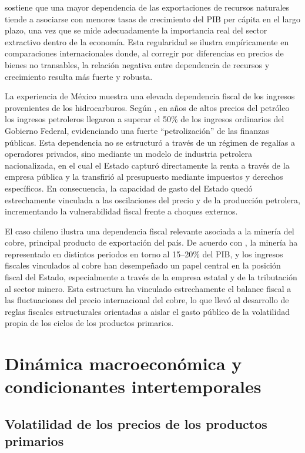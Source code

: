 \documentclass[../../PTFM.tex]{subfiles}
\begin{document}
	\textcite{Brckner2010} sostiene que una mayor dependencia de las exportaciones de recursos naturales tiende a asociarse con menores tasas de crecimiento del PIB per cápita en el largo plazo, una vez que se mide adecuadamente la importancia real del sector extractivo dentro de la economía. Esta regularidad se ilustra empíricamente en comparaciones internacionales donde, al corregir por diferencias en precios de bienes no transables, la relación negativa entre dependencia de recursos y crecimiento resulta más fuerte y robusta.
	
	La experiencia de México muestra una elevada dependencia fiscal de los ingresos provenientes de los hidrocarburos. Según \textcite{GarciaMorales2014}, en años de altos precios del petróleo los ingresos petroleros llegaron a superar el 50\% de los ingresos ordinarios del Gobierno Federal, evidenciando una fuerte “petrolización” de las finanzas públicas. Esta dependencia no se estructuró a través de un régimen de regalías a operadores privados, sino mediante un modelo de industria petrolera nacionalizada, en el cual el Estado capturó directamente la renta a través de la empresa pública y la transfirió al presupuesto mediante impuestos y derechos específicos. En consecuencia, la capacidad de gasto del Estado quedó estrechamente vinculada a las oscilaciones del precio y de la producción petrolera, incrementando la vulnerabilidad fiscal frente a choques externos.
	
	El caso chileno ilustra una dependencia fiscal relevante asociada a la minería del cobre, principal producto de exportación del país. De acuerdo con \textcite{DeGregorio2004}, la minería ha representado en distintos periodos en torno al 15–20\% del PIB, y los ingresos fiscales vinculados al cobre han desempeñado un papel central en la posición fiscal del Estado, especialmente a través de la empresa estatal y de la tributación al sector minero. Esta estructura ha vinculado estrechamente el balance fiscal a las fluctuaciones del precio internacional del cobre, lo que llevó al desarrollo de reglas fiscales estructurales orientadas a aislar el gasto público de la volatilidad propia de los ciclos de los productos primarios.
	
	\section{Dinámica macroeconómica y condicionantes intertemporales}
	\label{sec:dinamica-macroeconomica}
	
	\subsection{Volatilidad de los precios de los productos primarios}
	\label{subsec:volatilidad-precios}
	
\end{document}
